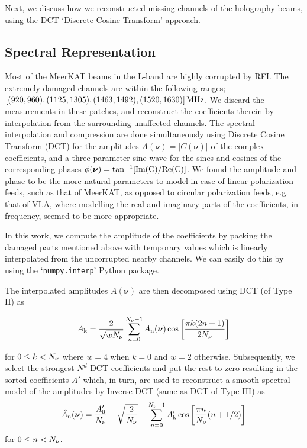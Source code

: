 Next, we discuss how we reconstructed missing channels of the holography beams, using the DCT \enquote*{Discrete Cosine Transform} approach.
 
\subsection{Spectral Representation}	   \label{chap5:spectral}

Most of the MeerKAT beams in the L-band are highly corrupted by RFI. The extremely damaged channels are within the following 
ranges;\\
$[(920, 960), (1125, 1305), (1463, 1492), (1520, 1630)]\, \rm MHz$.
We discard the measurements in these patches, and reconstruct the coefficients therein by interpolation from the surrounding unaffected
channels. The spectral interpolation and compression are done simultaneously using Discrete Cosine Transform (DCT) for the amplitudes
$A(\bm{\nu}) = |C(\bm{\nu})|$ of the complex coefficients, and a three-parameter sine wave for the sines and cosines of the corresponding phases
$\phi(\boldsymbol{\nu}) = \tan^{-1}[\rm Im(C)/\rm Re(C)]$.
We found the amplitude and phase to be the more natural parameters to model in case of linear polarization feeds, such as
that of MeerKAT, as opposed to circular polarization feeds, e.g. that of VLA, where modelling the real and imaginary
parts of the coefficients, in frequency, seemed to be more appropriate.

In this work, we compute the amplitude of the coefficients by packing the damaged parts mentioned above with temporary values which is 
linearly interpolated from the uncorrupted nearby channels. We can easily do this by using the \enquote*{\tt numpy.interp} Python package.

The interpolated amplitudes $A(\bm{\nu})$ are then decomposed using DCT (of Type II) as
 
 \begin{equation}\label{eq:dctA}
 A_{\rm k} = \frac{2}{\sqrt{wN_{\rm \nu}}} \sum_{n=0}^{N_{\rm \nu}-1}  A_{\rm n}(\boldsymbol{\nu}) \cos\left[ \frac{\pi k (2n +1)}{2N_{\rm \nu}} \right]
\end{equation}
 
 \noindent for $0 \leq  k < N_{\rm \nu}$ where $w = 4$ when $k = 0$ and $w = 2$ otherwise. Subsequently, we select the strongest $N^d$ DCT coefficients 
 and put the rest to zero resulting in the sorted coefficients $A'$ which, in turn, are used to reconstruct a smooth
spectral model of the amplitudes by Inverse DCT (same as DCT of Type III) as
\begin{equation}\label{eq:dctB}
 \hat{A}_{\rm n}(\boldsymbol{\nu}) = \frac{A'_{\rm 0}}{N_{\rm \nu}} + \sqrt{\frac{2}{N_{\rm \nu}}}+ \sum_{n=0}^{N_{\rm \nu}-1}  A'_{\rm k} \cos\left[ \frac{\pi n}{N_{\rm \nu}}(n+1/2) \right]
 \end{equation}
 for $0 \leq n < N_{\rm \nu}$.
 
